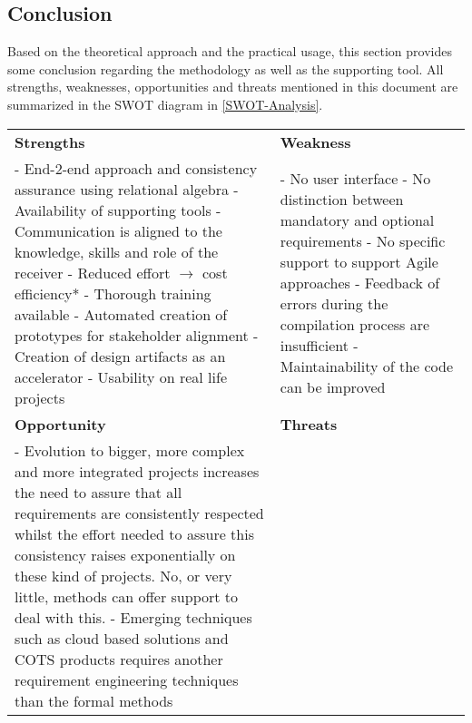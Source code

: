 
\subsection{Conclusion}
\label{sec:approachconclusion}
Based on the theoretical approach and the practical usage, this section provides some conclusion regarding the methodology as well as the supporting tool.
All strengths, weaknesses, opportunities and threats mentioned in this document are summarized in the SWOT diagram in \autoref{SWOT-Analysis}.

\begin{table}[ht!]
\small
\begin{tabular}{|p{8cm}||p{8cm}|}
\cellcolor[HTML]{9B9B9B}\textbf{Strengths} & \cellcolor[HTML]{9B9B9B}\textbf{Weakness} \\

- End-2-end approach and consistency assurance using relational algebra\newline
- Availability of supporting tools \newline
- Communication is aligned to the knowledge, skills and role of the receiver \newline
- Reduced effort $\rightarrow$ cost efficiency* \newline
- Thorough training available \newline
- Automated creation of prototypes for stakeholder alignment \newline
- Creation of design artifacts as an accelerator \newline
- Usability on real life projects &%
%
- No user interface\newline
- No distinction between mandatory and optional requirements \newline
- No specific support to support Agile approaches \newline
- Feedback of errors during the compilation process are insufficient \newline
- Maintainability of the code can be improved \\\hline\hline

\cellcolor[HTML]{9B9B9B}\textbf{Opportunity} & \cellcolor[HTML]{9B9B9B}\textbf{Threats} \\
- Evolution to bigger, more complex and more integrated projects increases the need to assure that all requirements are consistently respected whilst the effort needed to assure this consistency raises exponentially on these kind of projects. No, or very little, methods can offer support to deal with this.\newline
- Emerging techniques such as cloud based solutions and COTS products requires another requirement engineering techniques than the formal  methods &


\end{tabular}
\end{table}
